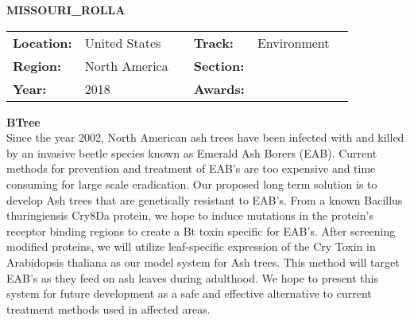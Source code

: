\textbf{\uppercase{Missouri\_Rolla}}
\FloatBarrier
\begin{table}[h]
\begin{tabular}{lp{2.5cm}llll}
\textbf{Location:} & United States & \multicolumn{1}{|l}{} & \textbf{Track:}   & Environment \\
\textbf{Region:}   & North America   & \multicolumn{1}{|l}{} & \textbf{Section:} &  \\
\textbf{Year:}     & 2018   & \multicolumn{1}{|l}{} & \textbf{Awards:}  &
\end{tabular}
\end{table}
\FloatBarrier
\noindent	\textbf{BTree} \vspace{.2cm}\\
Since the year 2002, North American ash trees have been infected with and killed by an invasive beetle species known as Emerald Ash Borers (EAB). Current methods for prevention and treatment of EAB’s are too expensive and time consuming for large scale eradication. Our proposed long term solution is to develop Ash trees that are genetically resistant to EAB’s. From a known Bacillus thuringiensis Cry8Da protein, we hope to induce mutations in the protein’s receptor binding regions to create a Bt toxin specific for EAB’s. After screening modified proteins, we will utilize leaf-specific expression of the Cry Toxin in Arabidopsis thaliana as our model system for Ash trees. This method will target EAB’s as they feed on ash leaves during adulthood. We hope to present this system for future development as a safe and effective alternative to current treatment methods used in affected areas. 
\vspace{2cm}

